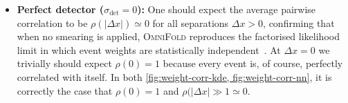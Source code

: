             \begin{itemize}
            \item \textbf{Perfect detector ($\sigma_{\det}=0$):}
                One should expect the average pairwise correlation to be $\rho(|\Delta x|) \simeq 0$ for all separations $\Delta x>0$, confirming that when no smearing is applied, \textsc{OmniFold} reproduces the {factorised likelihood} limit in which event weights are statistically independent~\cite{andreassen_omnifold_2020,Milton:2025mug}.
                At $\Delta x = 0$ we trivially should expect $\rho(0)=1$ because every event is, of course, perfectly correlated with itself.
                In both \cref{fig:weight-corr-kde, fig:weight-corr-nn}, it is correctly the case that \(\rho(0) = 1\) and \(\rho(|\Delta x| \gg 1 \simeq 0.\)
                

\end{itemize}
